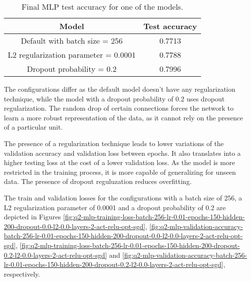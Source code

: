 \documentclass[12pt]{article}
\begin{document}
\begin{enumerate}[leftmargin=\labelsep]
\begin{enumerate}[label=\alph*)]
                    \begin{table}[H]
                        \centering
                        \begin{tabular}{|c|c|}
                            \hline
                            Model                                & Test accuracy \\ \hline
                            Default with batch size = 256        & 0.7713        \\ \hline
                            L2 regularization parameter = 0.0001 & 0.7788        \\ \hline
                            Dropout probability = 0.2            & 0.7996        \\ \hline
                        \end{tabular}
                        \caption{Final MLP test accuracy for one of the models.}
                        \label{tab:mlp-configuration-accuracy}
                    \end{table}

                    The configurations differ as the default model doesn't have any regularization technique, while the model with a dropout probability of 0.2 uses dropout regularization. The random drop of certain connections forces the network to learn a more robust representation of the data, as it cannot rely on the presence of a particular unit.

                    \vspace{12pt}

                    The presence of a regularization technique leads to lower variations of the validation accuracy and validation loss between epochs. It also translates into a higher testing loss at the cost of a lower validation loss. As the model is more restricted in the training process, it is more capable of generalizing for unseen data. The presence of dropout reguluzation reduces overfitting.

                    \vspace{12pt}

                    The train and validation losses for the configurations with a batch size of 256, a L2 regularization parameter of 0.0001 and a dropout probability of 0.2 are depicted in Figures \ref{fig:q2-mlp-training-loss-batch-256-lr-0.01-epochs-150-hidden-200-dropout-0.0-l2-0.0-layers-2-act-relu-opt-sgd}, \ref{fig:q2-mlp-validation-accuracy-batch-256-lr-0.01-epochs-150-hidden-200-dropout-0.0-l2-0.0-layers-2-act-relu-opt-sgd}, \ref{fig:q2-mlp-training-loss-batch-256-lr-0.01-epochs-150-hidden-200-dropout-0.2-l2-0.0-layers-2-act-relu-opt-sgd} and \ref{fig:q2-mlp-validation-accuracy-batch-256-lr-0.01-epochs-150-hidden-200-dropout-0.2-l2-0.0-layers-2-act-relu-opt-sgd}, respectively.


\end{enumerate}
\end{enumerate}
\end{document}
